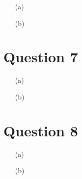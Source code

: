 \documentclass[a4paper,12pt]{article}
\begin{document}
\begin{enumerate}
\item[(a)]
\item[(b)]
\end{enumerate}
\clearpage
\section*{Question 7}
\begin{enumerate}
\item[(a)]
\item[(b)] 
\end{enumerate}
\clearpage
\section*{Question 8}
\begin{enumerate}
\item[(a)]
\item[(b)] 
\end{enumerate}
\clearpage
\end{document}
